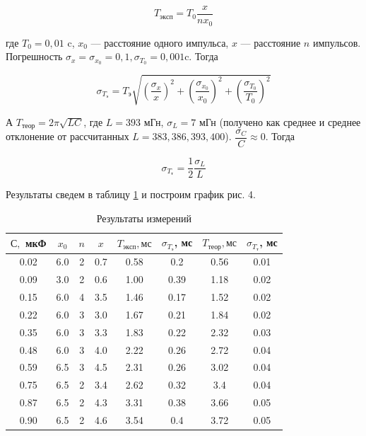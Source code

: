 \documentclass[12pt]{kiarticle}
\begin{document}
\begin{equation}\label{}
T_{эксп} = T_0 \dfrac{x}{nx_0}
\end{equation}

где $ T_0 = 0,01 $ c, $ x_0 $ --- расстояние одного импульса, $ x $ --- расстояние $ n $ импульсов. Погрешность $ \sigma_x = \sigma_{x_0} = 0,1, \sigma_{T_0} = 0,001  $c. Тогда 

\begin{equation}\label{}
\sigma_{T_э} = T_э \sqrt{ \left( \dfrac{ \sigma_x}{x} \right)^2 + \left( \dfrac{ \sigma_{x_0}}{x_0} \right)^2  +  \left( \dfrac{ \sigma_{T_0}}{T_0} \right)^2}
\end{equation}

А $ T_{теор} = 2\pi\sqrt{LC} $, где $ L = 393 $ мГн, $ \sigma_L = 7 $ мГн (получено как среднее и среднее отклонение от рассчитанных $ L = 383, 386, 393, 400 $). $ \dfrac{\sigma_C}{C} \approx 0 $. Тогда 

\begin{equation}\label{}
\sigma_{T_т} = \dfrac{1}{2} \dfrac{\sigma_L}{L}
\end{equation}

Результаты сведем в таблицу \ref{resT} и построим график рис. 4. 

\begin{table}[h!]
	\centering
	\caption{Результаты измерений}
	\begin{tabular}{|c|c|c|c|c|c|c|c|}
		\hline
		$ С,$ мкФ & $ x_0 $ & $ n $ & $ x $ & $ T_{эксп}, мс $& $ \sigma_{T_э} $, мс & $ T_{теор}, мс $ & $ \sigma_{T_т} $, мс \\
		\hline
		0.02 & 6.0 & 2 & 0.7 & 0.58 & 0.2 & 0.56 & 0.01 \\
		0.09 & 3.0 & 2 & 0.6 & 1.00 & 0.39 & 1.18 & 0.02 \\
		0.15 & 6.0 & 4 & 3.5 & 1.46 & 0.17 & 1.52 & 0.02 \\
		0.22 & 6.0 & 3 & 3.0 & 1.67 & 0.21 & 1.84 & 0.02 \\
		0.35 & 6.0 & 3 & 3.3 & 1.83 & 0.22 & 2.32 & 0.03 \\
		0.48 & 6.0 & 3 & 4.0 & 2.22 & 0.26 & 2.72 & 0.04 \\
		0.59 & 6.5 & 3 & 4.5 & 2.31 & 0.26 & 3.02 & 0.04 \\
		0.75 & 6.5 & 2 & 3.4 & 2.62 & 0.32 & 3.4 & 0.04 \\
		0.87 & 6.5 & 2 & 4.3 & 3.31 & 0.38 & 3.66 & 0.05 \\
		0.90 & 6.5 & 2 & 4.6 & 3.54 & 0.4 & 3.72 & 0.05 \\
		\hline
	\end{tabular}%
\label{resT}%
\end{table}%
\end{document}
